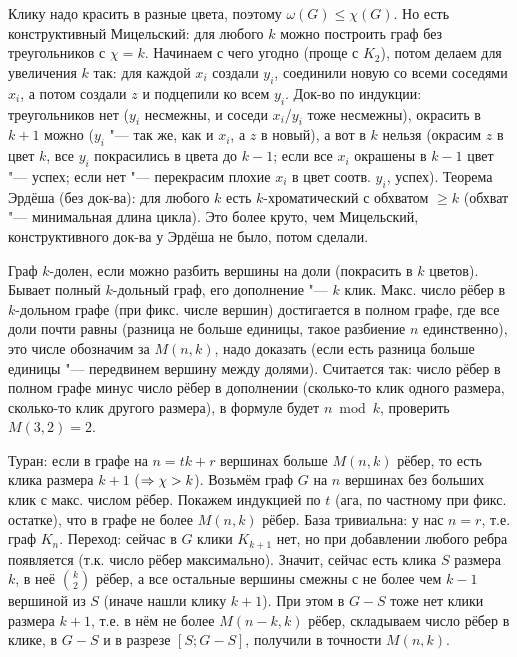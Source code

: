 \section{} %
	Клику надо красить в разные цвета, поэтому $\omega(G) \le \chi(G)$.
	Но есть конструктивный Мицельский: для любого $k$ можно построить граф без треугольников с $\chi=k$.
	Начинаем с чего угодно (проще с $K_2$), потом делаем для увеличения $k$ так: для каждой $x_i$ создали $y_i$, соединили новую со всеми соседями $x_i$,
	а потом создали $z$ и подцепили ко всем $y_i$.
	Док-во по индукции: треугольников нет ($y_i$ несмежны, и соседи $x_i$/$y_i$ тоже несмежны),
	окрасить в $k+1$ можно ($y_i$ "--- так же, как и $x_i$, а $z$ в новый),
	а вот в $k$ нельзя (окрасим $z$ в цвет $k$, все $y_i$ покрасились в цвета до $k-1$;
	если все $x_i$ окрашены в $k-1$ цвет "--- успех; если нет "--- перекрасим плохие $x_i$ в цвет соотв. $y_i$, успех).
	Теорема Эрдёша (без док-ва): для любого $k$ есть $k$-хроматический с обхватом $\ge k$ (обхват "--- минимальная длина цикла).
	Это более круто, чем Мицельский, конструктивного док-ва у Эрдёша не было, потом сделали.

	Граф $k$-долен, если можно разбить вершины на доли (покрасить в $k$ цветов).
	Бывает полный $k$-дольный граф, его дополнение "--- $k$ клик.
	Макс. число рёбер в $k$-дольном графе (при фикс. числе вершин) достигается в полном графе, где все доли почти равны (разница не больше единицы,
	такое разбиение $n$ единственно), это числе обозначим за $M(n, k)$, надо доказать (если есть разница больше единицы "--- передвинем вершину между долями).
	Считается так: число рёбер в полном графе минус число рёбер в дополнении (сколько-то клик одного размера, сколько-то клик другого размера),
	в формуле будет $n \bmod k$, проверить $M(3, 2)=2$.

	Туран: если в графе на $n=tk+r$ вершинах больше $M(n, k)$ рёбер, то есть клика размера $k+1$ ($\Rightarrow \chi>k$).
	Возьмём граф $G$ на $n$ вершинах без больших клик с макс. числом рёбер.
	Покажем индукцией по $t$ (ага, по частному при фикс. остатке), что в графе не более $M(n,k)$ рёбер.
	База тривиальна: у нас $n=r$, т.е. граф $K_n$.
	Переход: сейчас в $G$ клики $K_{k+1}$ нет, но при добавлении любого ребра появляется (т.к. число рёбер максимально).
	Значит, сейчас есть клика $S$ размера $k$, в неё $\binom{k}{2}$ рёбер, а все остальные вершины смежны с не более чем $k-1$ вершиной из $S$ (иначе нашли клику $k+1$).
	При этом в $G-S$ тоже нет клики размера $k+1$, т.е. в нём не более $M(n-k,k)$ рёбер, складываем число рёбер в клике, в $G-S$ и в разрезе $[S;G-S]$, получили в точности $M(n,k)$.
